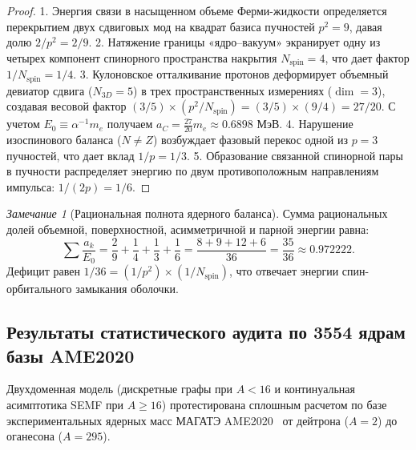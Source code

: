 \documentclass[11pt,a4paper]{article}
\theoremstyle{definition}
\theoremstyle{remark}
\newtheorem{remark}{Замечание}
\begin{document}
\begin{proof}
	1. Энергия связи в насыщенном объеме Ферми-жидкости определяется перекрытием двух сдвиговых мод на квадрат базиса пучностей $p^2 = 9$, давая долю $2/p^2 = 2/9$.
	2. Натяжение границы «ядро--вакуум» экранирует одну из четырех компонент спинорного пространства накрытия $N_{\mathrm{spin}} = 4$, что дает фактор $1/N_{\mathrm{spin}} = 1/4$.
	3. Кулоновское отталкивание протонов деформирует объемный девиатор сдвига ($N_{3D} = 5$) в трех пространственных измерениях ($\dim = 3$), создавая весовой фактор $(3/5) \times (p^2 / N_{\mathrm{spin}}) = (3/5) \times (9/4) = 27/20$. С учетом $E_0 \equiv \alpha^{-1} m_e$ получаем $a_C = \frac{27}{20} m_e \approx 0.6898\text{ МэВ}$.
	4. Нарушение изоспинового баланса ($N \ne Z$) возбуждает фазовый перекос одной из $p=3$ пучностей, что дает вклад $1/p = 1/3$.
	5. Образование связанной спинорной пары в пучности распределяет энергию по двум противоположным направлениям импульса: $1/(2p) = 1/6$.
\end{proof}

\begin{remark}[Рациональная полнота ядерного баланса]
	Сумма рациональных долей объемной, поверхностной, асимметричной и парной энергии равна:
\begin{equation}
	\sum \frac{a_k}{E_0} = \frac{2}{9} + \frac{1}{4} + \frac{1}{3} + \frac{1}{6} = \frac{8 + 9 + 12 + 6}{36} = \frac{35}{36} \approx 0.972222.
\label{eq:semf_fractions_sum_exact}
\end{equation}
Дефицит равен $1/36 = (1/p^2) \times (1/N_{\mathrm{spin}})$, что отвечает энергии спин-орбитального замыкания оболочки.
\end{remark}

\subsection{Результаты статистического аудита по 3554 ядрам базы AME2020}

Двухдоменная модель (дискретные графы при $A < 16$ и континуальная асимптотика SEMF при $A \ge 16$) протестирована сплошным расчетом по базе экспериментальных ядерных масс МАГАТЭ AME2020~\cite{AME2020} от дейтрона ($A=2$) до оганесона ($A=295$).
\end{document}
